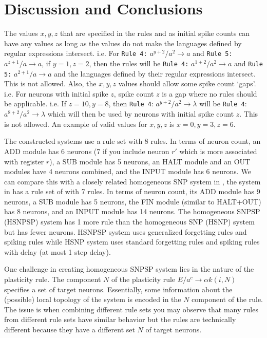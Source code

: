 \documentclass[runningheads,a4paper]{llncs}
\begin{document}



\section{Discussion and Conclusions} \label{sec-disc}

The values $x,y,z$ that are specified in the rules and as initial spike counts can have any values as long as the values do not make the languages
defined by regular expressions intersect. i.e. For \texttt{Rule 4:} $a^{y+2}/a^2 \rightarrow a$ and \texttt{Rule 5:} $a^{z+1}/a \rightarrow a$, if 
$y=1, z=2$, then the rules will be \texttt{Rule 4:} $a^{1+2}/a^2 \rightarrow a$ and \texttt{Rule 5:} $a^{2+1}/a \rightarrow a$ and the languages
defined by their regular expressions intersect. This is not allowed. Also, the $x,y,z$ values should allow some spike count `gaps'. i.e. For neurons
with initial spike $z$, spike count $z$ is a gap where no rules should be applicable. i.e. If $z=10, y=8$, then \texttt{Rule 4}: $a^{y+2}/a^2 
\rightarrow \lambda$ will be \texttt{Rule 4}: $a^{8+2}/a^2 \rightarrow \lambda$ which will then be used by neurons with initial spike count $z$. This
is not allowed. An example of valid values for $x,y,z$ is $x=0, y=3, z=6$.

The constructed systems use a rule set with 8 rules. In terms of neuron count, an ADD module has 6 neurons (7 if you include neuron $r'$ which is more
associated with register $r$), a SUB module has 5 neurons, an HALT module and an OUT modules have 4 neurons combined, and the INPUT module has 6 
neurons. We can compare this with a closely related homogeneous SNP system in \cite{HSNP}, the system in \cite{HSNP} has a rule set of with 7 rules. In
terms of neuron count, its ADD module has 9 neurons, a SUB module has 5 neurons, the FIN module (similar to HALT+OUT) has 8 neurons, and an INPUT 
module has 14 neurons. The homogeneous SNPSP (HSNPSP) system has 1 more rule than the homogeneous SNP (HSNP) system but has fewer neurons. HSNPSP system
uses generalized forgetting rules and spiking rules while HSNP system uses standard forgetting rules and spiking rules with delay (at most 1 step 
delay).

One challenge in creating homogeneous SNPSP system lies in the nature of the plasticity rule. The component $N$ of the plasticity rule $E/a^c 
\rightarrow \alpha k(i,N)$ specifies a set of target neurons. Essentially, some information about the (possible) local topology of the system is 
encoded in the $N$ component of the rule. The issue is when combining different rule sets you may observe that many rules from different rule sets 
have similar behavior but the rules are technically different because they have a different set $N$ of target neurons.
\end{document}
